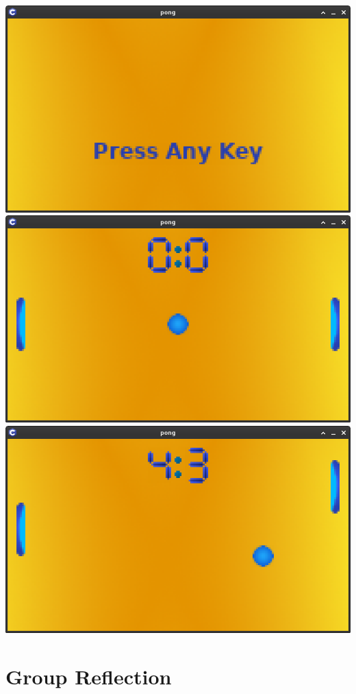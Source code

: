 \documentclass[11pt]{article}
\begin{document}
\noindent
\includegraphics[scale=0.235]{pong1}
\includegraphics[scale=0.235]{pong2}
\includegraphics[scale=0.235]{pong3}

\section{Group Reflection}
\end{document}
